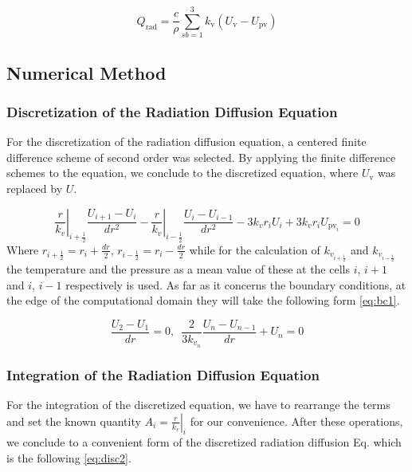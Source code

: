 \documentclass{warpdoc}
\begin{document}
\begin{equation}
    Q_\text{rad}=\frac{c}{\rho}\sum_{sb=1}^3k_\text{v}(U_\text{v}-U_\text{pv})
\end{equation}

\subsection{Numerical Method} 
\subsubsection{Discretization of the Radiation Diffusion Equation}
For the discretization of the radiation diffusion equation, a centered finite difference scheme of second order was selected. By applying the finite difference schemes to the  equation, we conclude to the discretized equation, where $U_\text{v}$ was replaced by $U$.

\begin{equation}
    \left.\frac{r}{k_v}\right\vert_{i+\frac{1}{2}}\frac{U_{i+1}-U_{i}}{dr^2}-\left.\frac{r}{k_v}\right\vert_{i-\frac{1}{2}}\frac{U_{i}-U_{i-1}}{dr^2}-3k_vr_iU_i+3k_vr_iU_{\text{pv}_i}=0 \label{eq:disc1}
\end{equation}
Where $r_{i+\frac{1}{2}}=r_i+\frac{dr}{2}$, $r_{i-\frac{1}{2}}=r_i-\frac{dr}{2}$ while for the calculation of $k_{v_{i+\frac{1}{2}}}$ and $k_{v_{i-\frac{1}{2}}}$ the temperature and the pressure as a mean value of these at the cells $i$, $i+1$ and $i$, $i-1$ respectively is used.
As far as it concerns the boundary conditions, at the edge of the computational domain they will take the following form \eqref{eq:bc1}.

\begin{equation}
\frac{U_2-U_1}{dr}=0,\enspace \frac{2}{3k_{v_n}}\frac{U_n-U_{n-1}}{dr}+U_n=0 \label{eq:bc1}
\end{equation}

\subsubsection{Integration of the Radiation Diffusion Equation }
For the integration of the discretized equation, we have to rearrange the terms and set the known quantity $A_i=\left.\frac{r}{k_{v}}\right\vert_i$ for our convenience. After these operations, we conclude to a convenient form of the discretized radiation diffusion Eq. which is the following \eqref{eq:disc2}.
\end{document}
